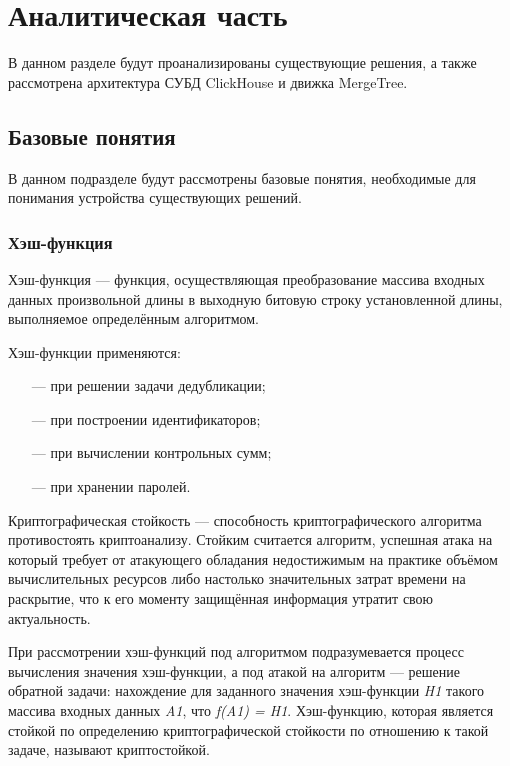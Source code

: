 \section{Аналитическая часть}

В данном разделе будут проанализированы существующие решения, а также рассмотрена архитектура СУБД ClickHouse и движка MergeTree.

\subsection{Базовые понятия}

В данном подразделе будут рассмотрены базовые понятия, необходимые для понимания устройства существующих решений.

\subsubsection{Хэш-функция}

Хэш-функция\cite{hash} --- функция, осуществляющая преобразование массива входных данных произвольной длины в выходную битовую строку установленной длины, выполняемое определённым алгоритмом.

Хэш-функции применяются:
\begin{itemize}
    \item[---] при решении задачи дедубликации;
    \item[---] при построении идентификаторов;
    \item[---] при вычислении контрольных сумм;
    \item[---] при хранении паролей.
\end{itemize}

Криптографическая стойкость \cite{crypto} --- способность криптографического алгоритма противостоять криптоанализу. Стойким считается алгоритм, успешная атака на который требует от атакующего обладания недостижимым на практике объёмом вычислительных ресурсов либо настолько значительных затрат времени на раскрытие, что к его моменту защищённая информация утратит свою актуальность.

При рассмотрении хэш-функций под алгоритмом подразумевается процесс вычисления значения хэш-функции, а под атакой на алгоритм --- решение обратной задачи: нахождение для заданного значения хэш-функции \textit{H1} такого массива входных данных \textit{A1}, что \textit{f(A1) = H1}. Хэш-функцию, которая является стойкой по определению криптографической стойкости по отношению к такой задаче, называют криптостойкой.

